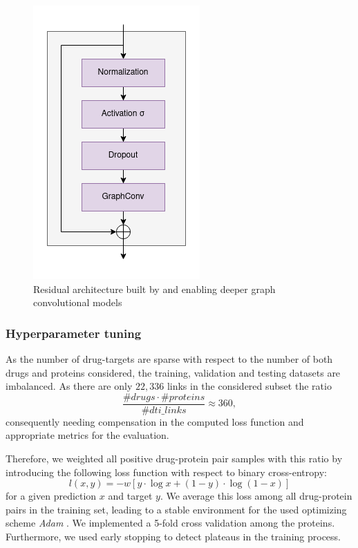 \documentclass{bioinfo}
\begin{document}
\begin{figure}[!tpb]%
	\centerline{\includegraphics[width=0.5\columnwidth]{figures/ResGraphConvBlocks.png}}
	\caption{Residual architecture built by \citet{DeepGCN2019} and \citet{DeeperGCN2020} enabling deeper graph convolutional models}
	\label{fig:ResGraphConvBlocks}
\end{figure}




\subsubsection{Hyperparameter tuning}
As the number of drug-targets are sparse with respect to the number of
both drugs and proteins considered, the training, validation and
testing datasets are imbalanced. As there are only $22,336$ links in
the considered subset the ratio
\begin{equation*}
	\frac{\#drugs \cdot \#proteins}{\#dti\_links} \approx 360,
\end{equation*}
consequently needing compensation in the computed loss function and
appropriate metrics for the evaluation.

Therefore, we weighted all positive drug-protein pair samples with
this ratio by introducing the following loss function with respect to
binary cross-entropy:
\begin{equation}
	l(x,y) = - w \left[ y \cdot \log x + (1 - y) \cdot \log (1 - x) \right]
\end{equation}
for a given prediction $x$ and target $y$. We average this loss among
all drug-protein pairs in the training set, leading to a stable
environment for the used optimizing scheme \textit{Adam}
\citep{Adam2014}. We implemented a 5-fold cross validation among the
proteins. Furthermore, we used early stopping to detect plateaus in
the training process.
\end{document}
